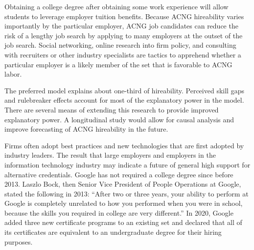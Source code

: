\documentclass[review]{elsarticle}
\begin{document}
Obtaining a college degree after obtaining some work experience will allow students to leverage employer tuition benefits.
Because ACNG hireability varies importantly by the particular employer, ACNG job candidates can reduce the risk of a lengthy job search by applying to many employers at the outset of the job search.
Social networking, online research into firm policy, and consulting with recruiters or other industry specialists are tactics to apprehend whether a particular employer is a likely member of the set that is favorable to ACNG labor.


The preferred model explains about one-third of hireability.
Perceived skill gaps and rulebreaker effects account for most of the explanatory power in the model.
There are several means of extending this research to provide improved explanatory power.
A longitudinal study would allow for causal analysis and improve forecasting of ACNG hireability in the future.

Firms often adopt best practices and new technologies that are first adopted by industry leaders.
The result that large employers and employers in the information technology industry
may indicate a future of general high support for alternative credentials.
Google has not required a college degree since before 2013\cite{bryant2013head}.
Laszlo Bock, then Senior Vice President of People Operations at Google, stated the following in 2013:
``After two or three years, your ability to perform at Google is completely unrelated to how you performed when you were in school, because the skills you required in college are very different.''
In 2020, Google added three new certificate programs to an existing set and declared that all of its certificates are equivalent to an undergraduate degree for their hiring purposes\cite{hess_2020}.
\end{document}
